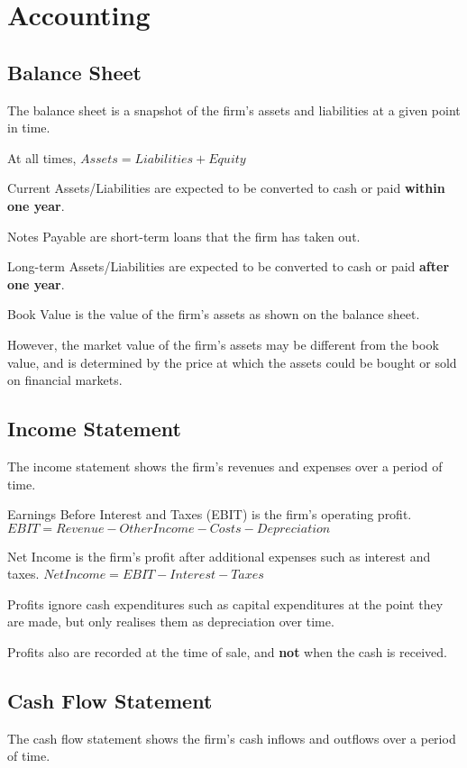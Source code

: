 \section{Accounting}
\subsection{Balance Sheet}
The balance sheet is a snapshot of the firm's assets and liabilities at a given point in time.

At all times, $Assets = Liabilities + Equity$

Current Assets/Liabilities are expected to be converted to cash or paid \textbf{within one year}.

\begin{callout}
	Notes Payable are short-term loans that the firm has taken out.
\end{callout}

Long-term Assets/Liabilities are expected to be converted to cash or paid \textbf{after one year}.

Book Value is the value of the firm's assets as shown on the balance sheet.

However, the market value of the firm's assets may be different from the book value, and is determined
by the price at which the assets could be bought or sold on financial markets.

\subsection{Income Statement}
The income statement shows the firm's revenues and expenses over a period of time.

Earnings Before Interest and Taxes (EBIT) is the firm's operating profit.
$EBIT = Revenue - Other Income - Costs - Depreciation$

Net Income is the firm's profit after additional expenses such as interest and taxes.
$Net Income = EBIT - Interest - Taxes$

Profits ignore cash expenditures such as capital expenditures at the point they are made, but only realises them 
as depreciation over time.

Profits also are recorded at the time of sale, and \textbf{not} when the cash is received.

\subsection{Cash Flow Statement}
The cash flow statement shows the firm's cash inflows and outflows over a period of time.

